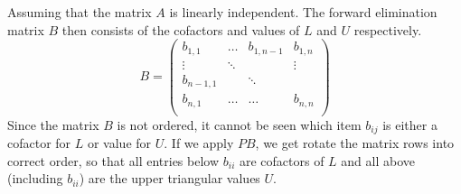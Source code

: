 Assuming that the matrix $A$ is linearly independent. The forward elimination matrix $B$ then consists of the cofactors and values of $L$ and $U$ respectively. 
\begin{equation*}
B = \left( \begin{array}{cccc}
b_{1,1} & \hdots & b_{1,n-1} & b_{1,n} \\
\vdots & \ddots &  & \vdots\\ 
b_{n-1,1} &  &  \ddots & \\
b_{n,1} & \hdots & \hdots & b_{n,n}\\ 
\end{array} \right)
\end{equation*}
Since the matrix $B$ is not ordered, it cannot be seen which item $b_{ij}$ is either a cofactor for $L$ or value for $U$.
If we apply $PB$, we get rotate the matrix rows into correct order, so that all entries below $b_{ii}$ are cofactors of $L$ and all above (including $b_{ii}$) are the upper triangular values $U$.



